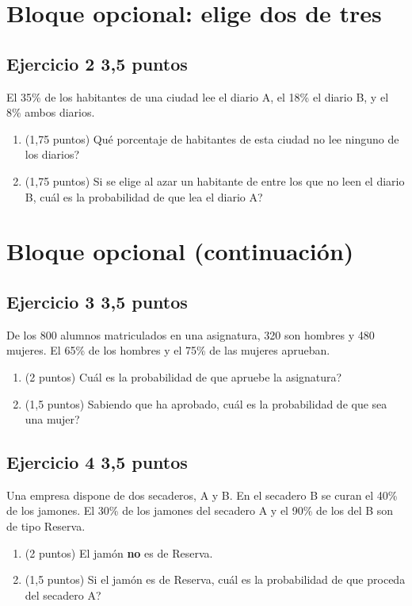 \documentclass[11pt]{article}
\begin{document}
\section*{Bloque opcional: elige dos de tres}
\subsection*{Ejercicio 2 \hfill 3,5 puntos} El 35\% de los habitantes de una ciudad lee el diario A, el 18\% el diario B, y el 8\% ambos diarios.

\begin{enumerate}[label=(\alph*)]

\item (1,75 puntos)  \textquestiondown{}Qué porcentaje de habitantes de esta ciudad no lee ninguno de los diarios?



\item (1,75 puntos)  Si se elige al azar un habitante de entre los que no leen el diario B, \textquestiondown{}cuál es la probabilidad de que lea el diario A?



\end{enumerate}

\clearpage
\section*{Bloque opcional (continuación)}
\subsection*{Ejercicio 3 \hfill 3,5 puntos} De los 800 alumnos matriculados en una asignatura, 320 son hombres y 480 mujeres. El 65\% de los hombres y el 75\% de las mujeres aprueban.

\begin{enumerate}[label=(\alph*)]

\item (2 puntos)  \textquestiondown{}Cuál es la probabilidad de que apruebe la asignatura?



\item (1,5 puntos)  Sabiendo que ha aprobado, \textquestiondown{}cuál es la probabilidad de que sea una mujer?



\end{enumerate}


\subsection*{Ejercicio 4 \hfill 3,5 puntos}
Una empresa dispone de dos secaderos, A y B. En el secadero B se curan el 40\% de los jamones. El 30\% de los jamones del secadero A y el 90\% de los del B son de tipo Reserva.

\begin{enumerate}[label=(\alph*)]

\item (2 puntos)  El jamón \textbf{no} es de Reserva.



\item (1,5 puntos)  Si el jamón es de Reserva, \textquestiondown{}cuál es la probabilidad de que proceda del secadero A?



\end{enumerate}
\end{document}
